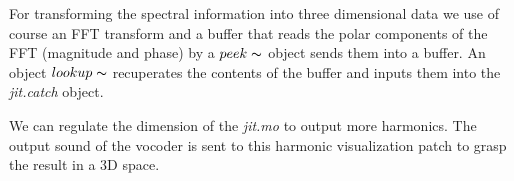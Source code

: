     For transforming the spectral information into three dimensional data we use of course an FFT transform and a buffer that reads the polar components of the FFT (magnitude and phase) by a $peek\thicksim$ object sends them into a buffer. An object $lookup\thicksim$ recuperates the contents of the buffer and inputs them into the \textit{jit.catch} object.

    We can regulate the dimension of the \textit{jit.mo} to output more harmonics. The output sound of the vocoder is sent to this harmonic visualization patch to grasp the result in a 3D space.

